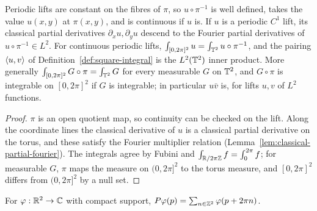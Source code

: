 \begin{lemma}
\label{lem:lift-torus}
\leanok
Periodic lifts are constant on the fibres of $\pi$, so $u\circ\pi^{-1}$ is well
defined, takes the value $u(x,y)$ at $\pi(x,y)$, and is continuous if $u$ is.
If $u$ is a periodic $C^1$ lift, its classical partial derivatives
$\partial_xu,\partial_yu$ descend to the Fourier partial derivatives of
$u\circ\pi^{-1}\in L^2$. For continuous periodic lifts,
$\int_{[0,2\pi]^2}u=\int_{\mathbb{T}^2}u\circ\pi^{-1}$, and the pairing $\langle u,v\rangle$ of
Definition~\ref{def:square-integral} is the $L^2(\mathbb{T}^2)$ inner product. More generally
$\int_{[0,2\pi]^2}G\circ\pi=\int_{\mathbb{T}^2}G$ for every measurable $G$ on $\mathbb{T}^2$, and $G\circ\pi$ is
integrable on $[0,2\pi]^2$ if $G$ is integrable; in particular $u\bar v$ is, for lifts $u,v$
of $L^2$ functions.
\end{lemma}

\begin{proof}
\leanok
$\pi$ is an open quotient map, so continuity can be checked on the lift. Along the
coordinate lines the classical derivative of $u$ is a classical partial derivative
on the torus, and these satisfy the Fourier multiplier relation
(Lemma~\ref{lem:classical-partial-fourier}). The integrals agree by Fubini and
$\int_{\mathbb{R}/2\pi\mathbb{Z}}f=\int_0^{2\pi}f$; for measurable $G$, $\pi$ maps the measure on
$(0,2\pi]^2$ to the torus measure, and $[0,2\pi]^2$ differs from $(0,2\pi]^2$ by a
null set.
\end{proof}

\begin{definition}
\label{def:lift-periodization}
\leanok
For $\varphi:\mathbb{R}^2\to\mathbb{C}$ with compact support, $P\varphi(p)=\sum_{n\in\mathbb{Z}^2}\varphi(p+2\pi n)$.
\end{definition}

